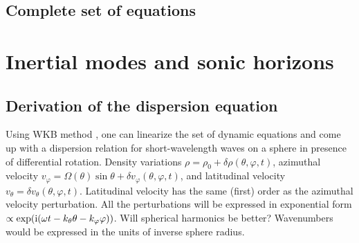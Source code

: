 \documentclass[usenatbib,onecolumn]{mnras}
\newcommand{\alert}[1]{\color{red} #1\color{black}}
\renewcommand{\i}{\ensuremath{{\rm i}}}
\begin{document}
\subsection{Complete set of equations}



\section{Inertial modes and sonic horizons}

\subsection{Derivation of the dispersion equation}

Using WKB method \citep{WKB}, one can linearize the set of dynamic equations
and come up with a dispersion relation for short-wavelength waves on a sphere
in presence of differential rotation. Density variations $\rho = \rho_0
+\delta \rho(\theta,\varphi, t)$, azimuthal velocity $v_\varphi = \Omega(\theta) \sin\theta +
\delta v_\varphi(\theta,\varphi, t)$, and latitudinal velocity $v_\theta = \delta
v_\theta(\theta,\varphi, t)$. Latitudinal velocity has the same (first) order
as the azimuthal velocity perturbation. All the perturbations will be
expressed in exponential form $\propto \exp(\i(\omega t - k_\theta \theta
- k_\varphi \varphi))$. \alert{Will spherical harmonics be better?}
Wavenumbers would be expressed in the units of inverse sphere radius. 
\end{document}
